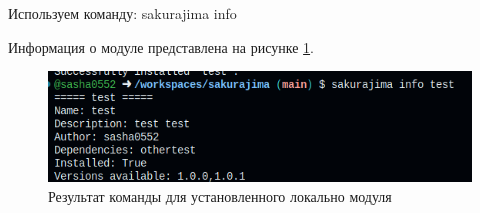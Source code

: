 Используем команду: sakurajima info

Информация о модуле представлена на рисунке \ref{fig:test10}.

\begin{figure}
  \centering
  \includegraphics[width=.8\textwidth]{graphics/test/info3.png}
  \caption{Результат команды для установленного локально модуля}
  \label{fig:test10}
\end{figure}


